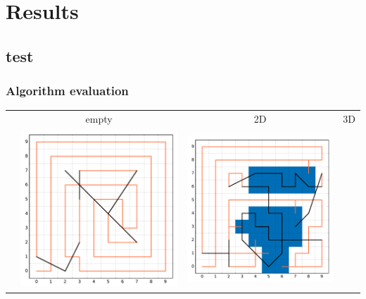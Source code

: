 \documentclass{beamer}
\begin{document}
\section{Results}
\subsection{test}

\begin{frame}
  \frametitle{Algorithm evaluation}
    \newlength{\fw}
    \setlength{\fw}{3cm}
  \begin{tabular}{rccc}
     & empty & 2D & 3D \\
    \raisebox{1.5cm}{NN} &
    \includegraphics[width=\fw]{2d_coverage_nn_empty.pdf} &
    \includegraphics[width=\fw]{2d_coverage_nn.pdf} &

\end{tabular}
\end{frame}
\end{document}
